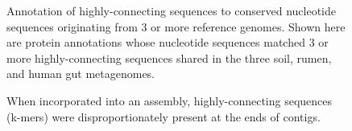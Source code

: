 \documentclass[11pt]{article} %
\begin{document}
\begin{figure}
\caption{Annotation of highly-connecting sequences to conserved nucleotide sequences originating from 3 or more reference genomes.  Shown here are protein annotations whose nucleotide sequences matched 3 or more highly-connecting sequences shared in the three soil, rumen, and human gut metagenomes.}
\end{figure}



\begin{figure}
\caption{When incorporated into an assembly, highly-connecting sequences (k-mers) were disproportionately present at the ends of contigs.}
\end{figure}
\end{document}
